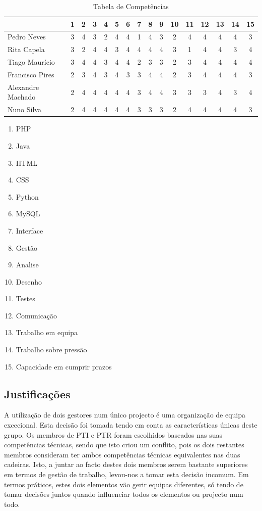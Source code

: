 \documentclass[12pt, a4paper, twoside]{report} %
\begin{document}
\begin{table}[h]
\centering
\begin{tabular}{|l|ccccccccccccccc|}
\hline
                  & 1 & 2 & 3 & 4 & 5 & 6 & 7 & 8 & 9 & 10 & 11 & 12 & 13 & 14 & 15 \\ \hline
Pedro Neves       & 3 & 4 & 3 & 2 & 4 & 4 & 1 & 4 & 3 & 2  & 4  & 4  & 4  & 4  & 3  \\ \hline
Rita Capela       & 3 & 2 & 4 & 4 & 3 & 4 & 4 & 4 & 4 & 3  & 1  & 4  & 4  & 3  & 4  \\ \hline
Tiago Maurício    & 3 & 4 & 4 & 3 & 4 & 4 & 2 & 3 & 3 & 2  & 3  & 4  & 4  & 4  & 4  \\ \hline
Francisco Pires   & 2 & 3 & 4 & 3 & 4 & 3 & 3 & 4 & 4 & 2  & 3  & 4  & 4  & 4  & 3  \\ \hline
Alexandre Machado & 2 & 4 & 4 & 4 & 4 & 4 & 3 & 4 & 4 & 3  & 3  & 3  & 4  & 3  & 4  \\ \hline
Nuno Silva        & 2 & 4 & 4 & 4 & 4 & 4 & 3 & 3 & 3 & 2  & 4  & 4  & 4  & 4  & 3  \\ \hline
\end{tabular}
\caption{Tabela de Competências}
\label{competencias1}
\end{table}

\begin{enumerate}
\item PHP
\item Java
\item HTML
\item CSS
\item Python
\item MySQL
\item Interface
\item Gestão
\item Analise
\item Desenho
\item Testes
\item Comunicação
\item Trabalho em equipa
\item Trabalho sobre pressão
\item Capacidade em cumprir prazos
\end{enumerate}

\subsection{Justificações}

A utilização de dois gestores num único projecto é uma organização de equipa excecional. Esta decisão foi tomada tendo em conta as características únicas deste grupo. Os membros de PTI e PTR foram escolhidos baseados nas suas competências técnicas, sendo que isto criou um conflito, pois os dois restantes membros consideram ter ambos competências técnicas equivalentes nas duas cadeiras. Isto, a juntar ao facto destes dois membros serem bastante superiores em termos de gestão de trabalho, levou-nos a tomar esta decisão incomum. Em termos práticos, estes dois elementos vão gerir equipas diferentes, só tendo de tomar decisões juntos quando influenciar todos os elementos ou projecto num todo.
\end{document}
